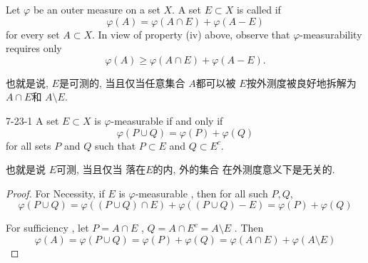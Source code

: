 \documentclass[../main.tex]{subfiles}
\begin{document}
\begin{definition}{}{}
Let $\varphi$ be an outer measure on a set $X$. A set $E \subset X$ is called  if
\[
\varphi(A) = \varphi(A \cap E) + \varphi(A - E)
\]
for every set $A \subset X$. In view of property (iv) above, observe that $\varphi$-measurability requires only
\[
\varphi(A) \ge \varphi(A \cap E) + \varphi(A - E).
\]
\end{definition}

\begin{note}
    也就是说, \(  E  \)是可测的, 当且仅当任意集合 \(  A  \)都可以被 \(  E  \)按外测度被良好地拆解为 \(  A\cap E  \)和 \(  A\setminus E  \).      
\end{note}

\begin{lemma}{}{7-23-1}
A set $E \subset X$ is $\varphi$-measurable if and only if
\[
\varphi(P \cup Q) = \varphi(P) + \varphi(Q)
\]
for all sets $P$ and $Q$ such that $P \subset E$ and $Q \subset E^{c}$.
\end{lemma}

\begin{note}
    也就是说 \(  E  \)可测, 当且仅当 落在\(  E  \)的内, 外的集合 在外测度意义下是无关的. 
\end{note}

\begin{proof}
   For Necessity, if \(  E   \) is \(   \varphi   \)-measurable , then for all such \(  P,Q  \),  \[
     \varphi \left( P\cup Q \right)=  \varphi \left( \left( P\cup Q \right)\cap E  \right) +  \varphi \left( \left( P\cup Q \right)-E  \right)=  \varphi \left( P \right)+  \varphi \left( Q \right)     
    \]  

    For sufficiency ,  let \(  P= A\cap E  \) , \(  Q= A\cap E^{c}= A\setminus  E  \) .     Then \[
       \varphi \left( A \right)=  \varphi \left( P\cup Q \right)=   \varphi \left( P \right)+  \varphi \left( Q \right)    =\varphi \left( A\cap E \right)+  \varphi \left( A\setminus E \right)  
    \]
    
    
\end{proof}
\end{document}
